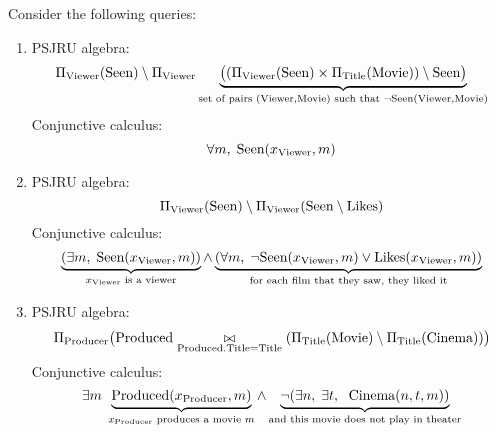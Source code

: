 \documentclass{../../cs-classes/cs-classes}
\newcommand*{\cinema}{\textnormal{Cinema}}
\newcommand*{\titl}{\textnormal{Title}}
\newcommand*{\movie}{\textnormal{Movie}}
\newcommand*{\seen}{\textnormal{Seen}}
\newcommand*{\likes}{\textnormal{Likes}}
\newcommand*{\produced}{\textnormal{Produced}}
\newcommand*{\producer}{\textnormal{Producer}}
\newcommand*{\viewer}{\textnormal{Viewer}}
\begin{document}
\begin{exercise}
    Consider the following queries:
  \begin{enumerate}
    \item PSJRU algebra:
    \begin{equation*}
        \Pi_{\viewer}(\seen)\setminus\Pi_{\viewer}\underbrace{\big((\Pi_{\viewer}(\seen)\times\Pi_{\titl}(\movie))\setminus\seen\big)}_{\textnormal{set of pairs }(\viewer, \movie) \textnormal{ such that } \lnot\seen(\viewer, \movie)}
    \end{equation*}
    Conjunctive calculus:
    \begin{equation*}
        \forall m, \; \seen(x_{\viewer}, m)
    \end{equation*}
    
    \item PSJRU algebra:
    \begin{equation*}
        \Pi_{\viewer}(\seen)\setminus\Pi_{\viewer}(\seen\setminus\likes)
    \end{equation*}
    Conjunctive calculus:
    \begin{equation*}
        \underbrace{(\exists m, \; \seen(x_{\viewer}, m))}_{x_{\viewer} \textnormal{ is a viewer}} \land \underbrace{(\forall m, \;\lnot \seen(x_{\viewer}, m)\lor\likes(x_{\viewer}, m))}_{\textnormal{for each film that they saw, they liked it}}
    \end{equation*}
    
    \item PSJRU algebra:
    \begin{equation*}
        \Pi_{\producer}\big(\produced\underset{\produced.\titl = \titl}{\bowtie}(\Pi_{\titl}(\movie) \setminus \Pi_{\titl}(\cinema))\big)
    \end{equation*}
    Conjunctive calculus:
    \begin{equation*}
        \exists m \; \underbrace{\produced(x_{\producer}, m)}_{x_{\producer} \textnormal{ produces a movie } m} \land \underbrace{\lnot(\exists n, \; \exists t, \; \cinema(n, t, m))}_{\textnormal{and this movie does not play in theater}}
    \end{equation*}
    

\end{enumerate}
\end{exercise}
\end{document}
